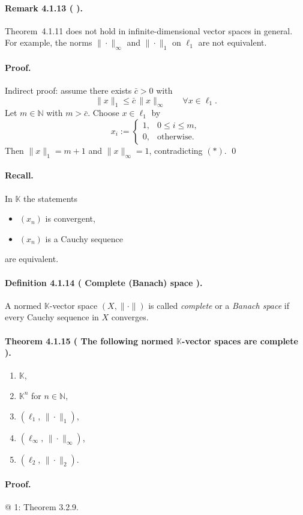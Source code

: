 \documentclass[12pt]{article}
\newcommand{\N}{\mathbb{N}}
\newcommand{\K}{\mathbb{K}} %
\newcommand{\NumberedDefinition}[3]{%
\paragraph*{Definition #1 ( #2 ).} #3\par}
\newcommand{\NumberedTheorem}[3]{%
\paragraph*{Theorem #1 ( #2 ).} #3\par}
\newcommand{\NumberedRemark}[3]{%
\paragraph*{Remark #1 ( #2 ).} #3\par}
\begin{document}
	\NumberedRemark{4.1.13}{}{Theorem~4.1.11 does not hold in infinite-dimensional vector spaces in general. For example, the norms $\|\cdot\|_\infty$ and $\|\cdot\|_1$ on $\ell_1$ are not equivalent.}
	\paragraph{Proof.}
	Indirect proof: assume there exists $\bar c>0$ with
	\[
		\|x\|_{1} \le \bar c\,\|x\|_{\infty} \qquad \forall x\in\ell_{1}.\tag{$*$}
	\]
	Let $m\in\N$ with $m>\bar c$. Choose $x\in\ell_{1}$ by
	\[
		x_i := \begin{cases} 1,& 0\le i\le m,\\ 0,& \text{otherwise.} \end{cases}
	\]
	Then $\|x\|_{1}=m+1$ and $\|x\|_{\infty}=1$, contradicting $(*)$. \qed

	\paragraph{Recall.} In $\K$ the statements
	\begin{itemize}[leftmargin=*]
		\item $(x_n)$ is convergent,
		\item $(x_n)$ is a Cauchy sequence
	\end{itemize}
	are equivalent.

	\NumberedDefinition{4.1.14}{Complete (Banach) space}{A normed $\K$-vector space $(X,\|\cdot\|)$ is called \emph{complete} or a \emph{Banach space} if every Cauchy sequence in $X$ converges.}

	\NumberedTheorem{4.1.15}{The following normed $\K$-vector spaces are complete}{\begin{enumerate}[label={(\arabic*)}, leftmargin=*]
		\item $\K$,
		\item $\K^{n}$ for $n\in\N$,
		\item $(\ell_{1},\,\|\cdot\|_{1})$,
		\item $(\ell_{\infty},\,\|\cdot\|_{\infty})$,
		\item $(\ell_{2},\,\|\cdot\|_{2})$.
\end{enumerate}}

\paragraph{Proof.}
@ 1: Theorem 3.2.9.
\end{document}
